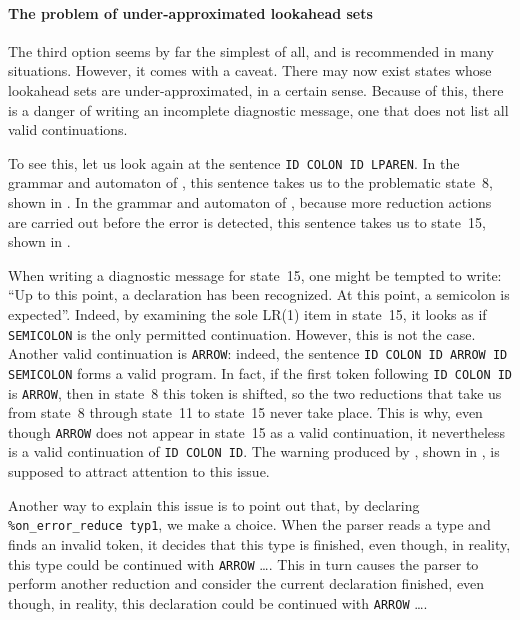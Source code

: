 \documentclass[onecolumn,11pt,nocopyrightspace,preprint]{sigplanconf}
\begin{document}
\paragraph{The problem of under-approximated lookahead sets}

The third option seems by far the simplest of all, and is recommended in many
situations. However, it comes with a caveat. There may now exist states whose
lookahead sets are under-approximated, in a certain sense. Because of this,
there is a danger of writing an incomplete diagnostic message, one that does
not list all valid continuations.

To see this, let us look again at the sentence
\texttt{ID COLON ID LPAREN}. In the grammar and automaton of ,
this sentence takes us to the problematic state~8, shown in
. In the grammar and automaton of
, because more reduction actions are
carried out before the error is detected, this sentence takes us
to state~15, shown in .

When writing a diagnostic message for state~15, one might be tempted to write:
``Up to this point, a declaration has been recognized. At this point, a
semicolon is expected''. Indeed, by examining the sole LR(1) item in state~15,
it looks as if \verb+SEMICOLON+ is the only permitted continuation. However,
this is not the case. Another valid continuation is \verb+ARROW+: indeed, the
sentence
\texttt{ID COLON ID ARROW ID SEMICOLON} forms a valid program. In fact, if
the first token following \texttt{ID COLON ID} is \texttt{ARROW}, then in
state~8 this token is shifted, so the two reductions that take us from state~8
through state~11 to state~15 never take place. This is why, even though
\texttt{ARROW} does not appear in state~15 as a valid continuation, it
nevertheless is a valid continuation of \texttt{ID COLON ID}. The warning
produced by \menhir, shown in , is supposed to
attract attention to this issue.

Another way to explain this issue is to point out that, by declaring
\verb+%on_error_reduce typ1+, we make a choice.
When the parser reads a type and finds an invalid token, it decides that this
type is finished, even though, in reality, this type could be continued
with \verb+ARROW+ \ldots. This in turn causes the parser to perform another
reduction and consider the current declaration finished, even though, in
reality, this declaration could be continued with \verb+ARROW+ \ldots.
\end{document}
